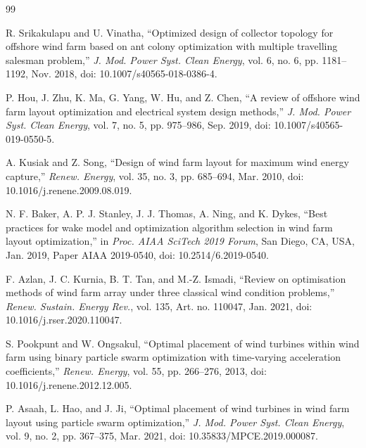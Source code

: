 {\footnotesize\setlength{\bibsep}{1pt plus 0.3ex}
\begin{thebibliography}{99}

R. Srikakulapu and U. Vinatha, ``Optimized design of collector topology for offshore wind farm based on ant colony optimization with multiple travelling salesman problem,'' \textit{J. Mod. Power Syst. Clean Energy}, vol. 6, no. 6, pp. 1181--1192, Nov. 2018, doi: 10.1007/s40565-018-0386-4.

P. Hou, J. Zhu, K. Ma, G. Yang, W. Hu, and Z. Chen, ``A review of offshore wind farm layout optimization and electrical system design methods,'' \textit{J. Mod. Power Syst. Clean Energy}, vol. 7, no. 5, pp. 975--986, Sep. 2019, doi: 10.1007/s40565-019-0550-5.

A. Kusiak and Z. Song, ``Design of wind farm layout for maximum wind energy capture,'' \textit{Renew. Energy}, vol. 35, no. 3, pp. 685--694, Mar. 2010, doi: 10.1016/j.renene.2009.08.019.

N. F. Baker, A. P. J. Stanley, J. J. Thomas, A. Ning, and K. Dykes, ``Best practices for wake model and optimization algorithm selection in wind farm layout optimization,'' in \textit{Proc. AIAA SciTech 2019 Forum}, San Diego, CA, USA, Jan. 2019, Paper AIAA 2019-0540, doi: 10.2514/6.2019-0540.

F. Azlan, J. C. Kurnia, B. T. Tan, and M.-Z. Ismadi, ``Review on optimisation methods of wind farm array under three classical wind condition problems,'' \textit{Renew. Sustain. Energy Rev.}, vol. 135, Art. no. 110047, Jan. 2021, doi: 10.1016/j.rser.2020.110047.

S. Pookpunt and W. Ongsakul, ``Optimal placement of wind turbines within wind farm using binary particle swarm optimization with time-varying acceleration coefficients,'' \textit{Renew. Energy}, vol. 55, pp. 266--276, 2013, doi: 10.1016/j.renene.2012.12.005.

P. Asaah, L. Hao, and J. Ji, ``Optimal placement of wind turbines in wind farm layout using particle swarm optimization,'' \textit{J. Mod. Power Syst. Clean Energy}, vol. 9, no. 2, pp. 367--375, Mar. 2021, doi: 10.35833/MPCE.2019.000087.


\end{thebibliography}}
